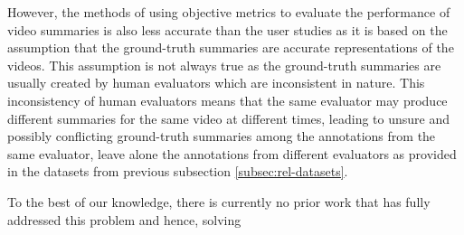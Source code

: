 			However, the methods of using objective metrics to evaluate the performance of video summaries is also less accurate than the user studies as it is based on the assumption that the ground-truth summaries are accurate representations of the videos. This assumption is not always true as the ground-truth summaries are usually created by human evaluators which are inconsistent in nature. This inconsistency of human evaluators means that the same evaluator may produce different summaries for the same video at different times, leading to unsure and possibly conflicting ground-truth summaries among the annotations from the same evaluator, leave alone the annotations from different evaluators as provided in the datasets from previous subsection \ref{subsec:rel-datasets}.

		
		To the best of our knowledge, there is currently no prior work that has fully addressed this problem and hence, solving